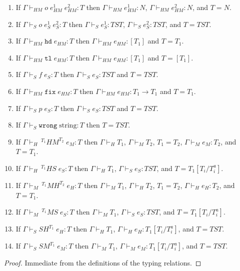 \begin{inversion}
\begin{enumerate}
\item If $\Gamma\vdash_{HM}o\;e_{HM}^{1}\;e_{HM}^{2}:T$ then $\Gamma\vdash_{HM}e_{HM}^{1}:N$, $\Gamma\vdash_{HM}e_{HM}^{2}:N$, and $T=N$.
\item If $\Gamma\vdash_{S}o\;e_{S}^{1}\;e_{S}^{2}:T$ then $\Gamma\vdash_{S}e_{S}^{1}:TST$, $\Gamma\vdash_{S}e_{S}^{2}:TST$, and $T=TST$.
\item If $\Gamma\vdash_{HM}\mathtt{hd}\;e_{HM}:T$ then $\Gamma\vdash_{HM}e_{HM}:[T_{1}]$ and $T=T_{1}$.
\item If $\Gamma\vdash_{HM}\mathtt{tl}\;e_{HM}:T$ then $\Gamma\vdash_{HM}e_{HM}:[T_{1}]$ and $T=[T_{1}]$.
\item If $\Gamma\vdash_{S}f\;e_{S}:T$ then $\Gamma\vdash_{S}e_{S}:TST$ and $T=TST$.
\item If $\Gamma\vdash_{HM}\mathtt{fix}\;e_{HM}:T$ then $\Gamma\vdash_{HM}e_{HM}:T_{1}\rightarrow T_{1}$ and $T=T_{1}$.
\item If $\Gamma\vdash_{S}p\;e_{S}:T$ then $\Gamma\vdash_{S}e_{S}:TST$ and $T=TST$.
\item If $\Gamma\vdash_{S}\mathtt{wrong}\;\mathrm{string}:T$ then $T=TST$.
\item If $\Gamma\vdash_{H}\,^{T_{1}}HM^{T_{2}}\;e_{M}:T$ then $\Gamma\vdash_{H}T_{1}$, $\Gamma\vdash_{M}T_{2}$, $T_{1}=T_{2}$, $\Gamma\vdash_{M}e_{M}:T_{2}$, and $T=T_{1}$.
\item If $\Gamma\vdash_{H}\,^{T_{1}}HS\;e_{S}:T$ then $\Gamma\vdash_{H}T_{1}$, $\Gamma\vdash_{S}e_{S}:TST$, and $T=T_{1}[T_{i}/T_{i}^{a}]$.
\item If $\Gamma\vdash_{M}\,^{T_{1}}MH^{T_{2}}\;e_{H}:T$ then $\Gamma\vdash_{M}T_{1}$, $\Gamma\vdash_{H}T_{2}$, $T_{1}=T_{2}$, $\Gamma\vdash_{H}e_{H}:T_{2}$, and $T=T_{1}$.
\item If $\Gamma\vdash_{M}\,^{T_{1}}MS\;e_{S}:T$ then $\Gamma\vdash_{M}T_{1}$, $\Gamma\vdash_{S}e_{S}:TST$, and $T=T_{1}[T_{i}/T_{i}^{a}]$.
\item If $\Gamma\vdash_{S}SH^{T_{1}}\;e_{H}:T$ then $\Gamma\vdash_{H}T_{1}$, $\Gamma\vdash_{H}e_{H}:T_{1}[T_{i}/T_{i}^{a}]$, and $T=TST$.
\item If $\Gamma\vdash_{S}SM^{T_{1}}\;e_{M}:T$ then $\Gamma\vdash_{M}T_{1}$, $\Gamma\vdash_{M}e_{M}:T_{1}[T_{i}/T_{i}^{a}]$, and $T=TST$.
\end{enumerate}
\begin{proof}
Immediate from the definitions of the typing relations.
\end{proof}
\end{inversion}